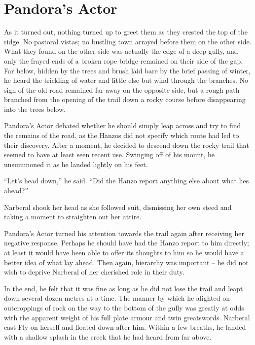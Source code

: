 \chapter{Pandora's Actor}

As it turned out, nothing turned up to greet them as they crested the top of the ridge. No pastoral vistas; no bustling town arrayed before them on the other side. What they found on the other side was actually the edge of a deep gully, and only the frayed ends of a broken rope bridge remained on their side of the gap. Far below, hidden by the trees and brush laid bare by the brief passing of winter, he heard the trickling of water and little else but wind through the branches. No sign of the old road remained far away on the opposite side, but a rough path branched from the opening of the trail down a rocky course before disappearing into the trees below.

 

Pandora’s Actor debated whether he should simply leap across and try to find the remains of the road, as the Hanzos did not specify which route had led to their discovery. After a moment, he decided to descend down the rocky trail that seemed to have at least seen recent use. Swinging off of his mount, he unsummoned it as he landed lightly on his feet.

 

“Let’s head down,” he said. “Did the Hanzo report anything else about what lies ahead?”

 

Narberal shook her head as she followed suit, dismissing her own steed and taking a moment to straighten out her attire.

 

Pandora’s Actor turned his attention towards the trail again after receiving her negative response. Perhaps he should have had the Hanzo report to him directly; at least it would have been able to offer its thoughts to him so he would have a better idea of what lay ahead. Then again, hierarchy was important – he did not wish to deprive Narberal of her cherished role in their duty.

 

In the end, he felt that it was fine as long as he did not lose the trail and leapt down several dozen metres at a time. The manner by which he alighted on outcroppings of rock on the way to the bottom of the gully was greatly at odds with the apparent weight of his full plate armour and twin greatswords. Narberal cast Fly on herself and floated down after him. Within a few breaths, he landed with a shallow splash in the creek that he had heard from far above.

